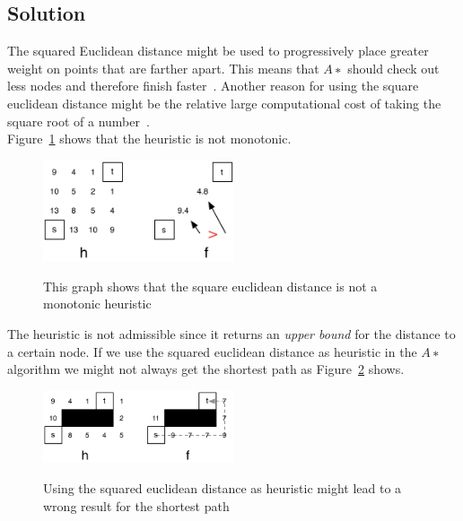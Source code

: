 \documentclass[a4paper, 12pt]{report}
\begin{document}
\subsection{Solution}

The squared Euclidean distance might be used to progressively place greater
weight on points that are farther apart. This means that $A∗$ should check out
less nodes and therefore finish faster~\cite{Wikipedia_Euclidean_Distance}.
Another reason for using the square euclidean distance might be the relative
large computational cost of taking the square root of a
number~\cite{Amit_A_Star}.\\

Figure~\ref{figure:Exercise_2_9_Monotonicity} shows that the heuristic is not
monotonic.

\begin{figure}[htbp]
    \caption{This graph shows that the square euclidean distance is not a
             monotonic heuristic}
    \vskip 0.2cm
    \centering
    \includegraphics[width=0.5\textwidth]{Figures/Exercise_2_9_Monotonicity}
    \label{figure:Exercise_2_9_Monotonicity}
\end{figure}

The heuristic is not admissible since it returns an \emph{upper bound} for the
distance to a certain node. If we use the squared euclidean distance as
heuristic in the $A∗$ algorithm we might not always get the shortest path as
Figure~\ref{figure:Exercise_2_9_Wrong_Path} shows.\\

\begin{figure}[htbp]
    \caption{Using the squared euclidean distance as heuristic might lead to a
             wrong result for the shortest path}
    \vskip 0.2cm
    \centering
    \includegraphics[width=0.5\textwidth]{Figures/Exercise_2_9_Wrong_Path}
    \label{figure:Exercise_2_9_Wrong_Path}
\end{figure}
\end{document}
